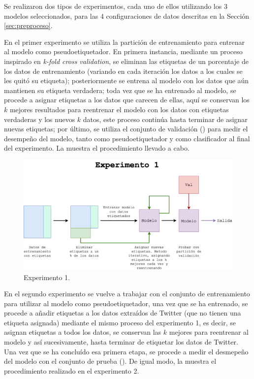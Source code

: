 \documentclass[a4paper]{llncs}
\begin{document}
Se realizaron dos tipos de experimentos, cada uno de ellos utilizando los 3
modelos seleccionados, para las 4 configuraciones de datos descritas en
la Sección \ref{sec:preproceso}.

En el primer experimento se utiliza la partición de entrenamiento para entrenar
al modelo como pseudoetiquetador. En primera instancia, mediante un proceso
inspirado en \emph{k-fold cross validation}, se eliminan las etiquetas de un
porcentaje de los datos de entrenamiento (variando en cada iteración los datos
a los cuales se les quitó su etiqueta); posteriormente se entrena al modelo con
los datos que aún mantienen su etiqueta verdadera; toda vez que se ha entrenado
al modelo, se procede a asignar etiquetas a los datos que carecen de ellas, aquí
se conservan los \(k\) mejores resultados para reentrenar el modelo con los datos
con etiquetas verdaderas y los nuevos \(k\) datos, este proceso continúa hasta
terminar de asignar nuevas etiquetas; por último, se utiliza el conjunto de
validación () para medir el desempeño del modelo, tanto como
pseudoetiquetador y como clasificador al final del experimento. La 
muestra el procedimiento llevado a cabo.

\begin{figure}[htbp!]
\centering
\includegraphics[keepaspectratio,width=\textwidth]{./img/comia_blue_exp1.png}
\caption{\label{fig:exp1}Experimento 1.}
\end{figure}

En el segundo experimento se vuelve a trabajar con el conjunto de entrenamiento
para utilizar al modelo como pseudoetiquetador, una vez que se ha entrenado,
se procede a añadir etiquetas a los datos extraídos de Twitter (que no tienen
una etiqueta asignada) mediante el mismo proceso del experimento 1, es decir,
se asignan etiquetas a todos los datos, se conservan las \(k\) mejores para
reentrenar al modelo y así sucesivamente, hasta terminar de etiquetar los datos
de Twitter. Una vez que se ha concluído esa primera etapa, se procede a medir
el desmepeño del modelo con el conjunto de prueba (). De
igual modo, la  muestra el procedimiento realizado en el
experimento 2.
\end{document}

